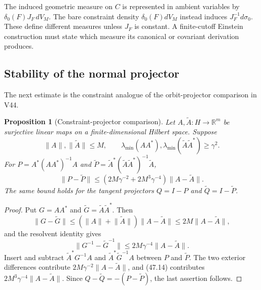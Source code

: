 \documentclass[11pt]{article}
\newtheorem{proposition}[theorem]{Proposition}
\begin{document}
\begin{warning}
\label{warn:v11v47-convention}
The induced geometric measure on \(C\) is represented in ambient
variables by \(\delta_0(F)J_F\,dV_M\).  The bare constraint density
\(\delta_0(F)dV_M\) instead induces \(J_F^{-1}d\sigma_0\).
These define different measures unless \(J_F\) is constant.  A
finite-cutoff Einstein construction must state which measure its
canonical or covariant derivation produces.
\end{warning}

\subsection{Stability of the normal projector}

The next estimate is the constraint analogue of the orbit-projector
comparison in V44.

\begin{proposition}[Constraint-projector comparison]
\label{prop:v11v47-projector}
Let \(A,\widetilde A:H\to\mathbb R^m\) be surjective linear maps on a
finite-dimensional Hilbert space.  Suppose
\[
 \lVert A\rVert,\lVert\widetilde A\rVert\le M,\qquad
 \lambda_{\min}(AA^*),\lambda_{\min}(\widetilde A\widetilde A^*)
       \ge\gamma^2.                                           \tag{47.11}
\]
For
\(P=A^*(AA^*)^{-1}A\) and
\(\widetilde P=\widetilde A^*(\widetilde A\widetilde A^*)^{-1}
\widetilde A\),
\[
 \lVert P-\widetilde P\rVert
 \le\left(2M\gamma^{-2}+2M^3\gamma^{-4}\right)
                     \lVert A-\widetilde A\rVert.             \tag{47.12}
\]
The same bound holds for the tangent projectors \(Q=I-P\) and
\(\widetilde Q=I-\widetilde P\).
\end{proposition}

\begin{proof}
Put \(G=AA^*\) and \(\widetilde G=\widetilde A\widetilde A^*\).
Then
\[
 \lVert G-\widetilde G\rVert
 \le(\lVert A\rVert+\lVert\widetilde A\rVert)
                    \lVert A-\widetilde A\rVert
 \le2M\lVert A-\widetilde A\rVert,                            \tag{47.13}
\]
and the resolvent identity gives
\[
 \lVert G^{-1}-\widetilde G^{-1}\rVert
 \le2M\gamma^{-4}\lVert A-\widetilde A\rVert.                 \tag{47.14}
\]
Insert and subtract
\(\widetilde A^*G^{-1}A\) and
\(\widetilde A^*\widetilde G^{-1}A\) between \(P\) and
\(\widetilde P\).  The two exterior differences contribute
\(2M\gamma^{-2}\lVert A-\widetilde A\rVert\), and (47.14) contributes
\(2M^3\gamma^{-4}\lVert A-\widetilde A\rVert\).
Since \(Q-\widetilde Q=-(P-\widetilde P)\), the last assertion follows.
\end{proof}
\end{document}
